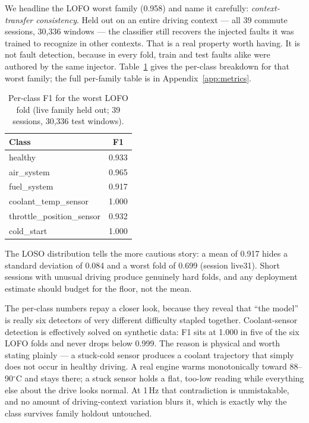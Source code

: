 We headline the LOFO worst family (0.958) and name it carefully:
\emph{context-transfer consistency}. Held out on an entire driving context
--- all 39 commute sessions, 30{,}336 windows --- the classifier still
recovers the injected faults it was trained to recognize in other contexts.
That is a real property worth having. It is not fault detection, because in
every fold, train and test faults alike were authored by the same injector.
Table~\ref{tab:lofoworst} gives the per-class breakdown for that worst
family; the full per-family table is in Appendix~\ref{app:metrics}.

\begin{table}[H]
  \centering
  \caption{Per-class F1 for the worst LOFO fold (live family held out;
    39 sessions, 30{,}336 test windows).}
  \label{tab:lofoworst}
  \begin{tabular}{lc}
    \toprule
    Class & F1\\
    \midrule
    healthy & 0.933\\
    air\_system & 0.965\\
    fuel\_system & 0.917\\
    coolant\_temp\_sensor & 1.000\\
    throttle\_position\_sensor & 0.932\\
    cold\_start & 1.000\\
    \bottomrule
  \end{tabular}
\end{table}

The LOSO distribution tells the more cautious story: a mean of 0.917 hides
a standard deviation of 0.084 and a worst fold of 0.699 (session live31).
Short sessions with unusual driving produce genuinely hard folds, and any
deployment estimate should budget for the floor, not the mean.

The per-class numbers repay a closer look, because they reveal that ``the
model'' is really six detectors of very different difficulty stapled
together. Coolant-sensor detection is effectively solved on synthetic data:
F1 sits at 1.000 in five of the six LOFO folds and never drops below 0.999.
The reason is physical and worth stating plainly --- a stuck-cold sensor
produces a coolant trajectory that simply does not occur in healthy
driving. A real engine warms monotonically toward 88--90$^{\circ}$C and
stays there; a stuck sensor holds a flat, too-low reading while everything
else about the drive looks normal. At 1\,Hz that contradiction is
unmistakable, and no amount of driving-context variation blurs it, which is
exactly why the class survives family holdout untouched.

